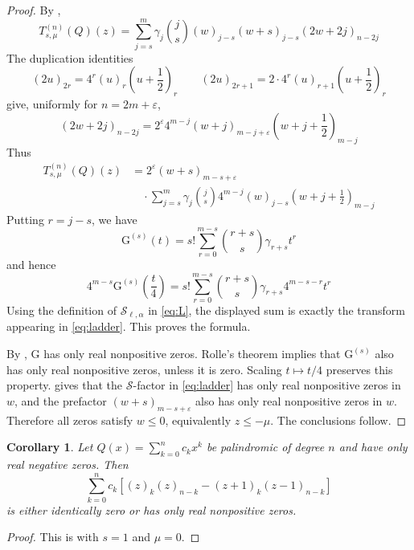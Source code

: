 \documentclass[a4paper,11pt,reqno]{amsart}
\numberwithin{equation}{section}
\newtheorem{corollary}{Corollary}
\theoremstyle{remark}
\newcommand{\Gpoly}{\mathrm{G}}     %
\begin{document}
\begin{proof}
By ,
\[
  T_{s,\mu}^{(n)}(Q)(z)
  =
  \sum_{j=s}^{m}
  \gamma_j\binom{j}{s}
  (w)_{j-s}(w+s)_{j-s}(2w+2j)_{n-2j}
\]
The duplication identities
\[
  (2u)_{2r}=4^r(u)_r\left(u+\frac12\right)_r
  \qquad
  (2u)_{2r+1}=2\cdot4^r(u)_{r+1}\left(u+\frac12\right)_r
\]
give, uniformly for \(n=2m+\varepsilon\),
\[
  (2w+2j)_{n-2j}
  =
  2^\varepsilon4^{m-j}
  (w+j)_{m-j+\varepsilon}
  \left(w+j+\frac12\right)_{m-j}
\]
Thus
\[
\begin{aligned}
  T_{s,\mu}^{(n)}(Q)(z)
  &=
  2^\varepsilon
  (w+s)_{m-s+\varepsilon} \\
  &\quad\cdot
  \sum_{j=s}^{m}
  \gamma_j\binom{j}{s}4^{m-j}
  (w)_{j-s}
  \left(w+j+\frac12\right)_{m-j}
\end{aligned}
\]
Putting \(r=j-s\), we have
\[
  \Gpoly^{(s)}(t)
  =
  s!\sum_{r=0}^{m-s}
  \binom{r+s}{s}\gamma_{r+s}t^r
\]
and hence
\[
  4^{m-s}\Gpoly^{(s)}\left(\frac t4\right)
  =
  s!\sum_{r=0}^{m-s}
  \binom{r+s}{s}\gamma_{r+s}4^{m-s-r}t^r
\]
Using the definition of \(\mathcal S_{\ell,\alpha}\) in \eqref{eq:L}, the displayed sum is exactly the transform appearing in \eqref{eq:ladder}. This proves the formula.

By , \(\Gpoly\) has only real nonpositive zeros. Rolle's theorem implies that \(\Gpoly^{(s)}\) also has only real nonpositive zeros, unless it is zero. Scaling \(t\mapsto t/4\) preserves this property.  gives that the \(\mathcal S\)-factor in \eqref{eq:ladder} has only real nonpositive zeros in \(w\), and the prefactor \((w+s)_{m-s+\varepsilon}\) also has only real nonpositive zeros in \(w\). Therefore all zeros satisfy \(w\leq0\), equivalently \(z\leq-\mu\). The conclusions follow.
\end{proof}

\begin{corollary}\label{cor:original-kernel-pal}
Let \(Q(x)=\sum_{k=0}^{n}c_kx^k\) be palindromic of degree \(n\) and have only real negative zeros. Then
\[
  \sum_{k=0}^{n}
  c_k
  \left[
    (z)_k(z)_{n-k}-(z+1)_k(z-1)_{n-k}
  \right]
\]
is either identically zero or has only real nonpositive zeros.
\end{corollary}

\begin{proof}
This is  with \(s=1\) and \(\mu=0\).
\end{proof}
\end{document}
